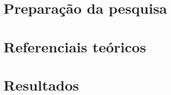 \documentclass[12pt,            %
               oneside,         %
               a4paper,         %
               english,         %
               french,          %
               spanish,         %
               brazil]{abntex2} %
\begin{document}
    \textual
    
    
    
    

    \part{Preparação da pesquisa}
    
    

    \part{Referenciais teóricos}

    

    \part{Resultados}

    

    


    

    \postextual

    

    
    
    
    
    
    
    
\end{document}
